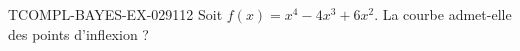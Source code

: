 \begin{exercice}{TCOMPL-BAYES-EX-029}{1}{12}
Soit $f(x) = x^4 - 4x^3 + 6x^2$. La courbe admet-elle des points d'inflexion ?

\end{exercice}
